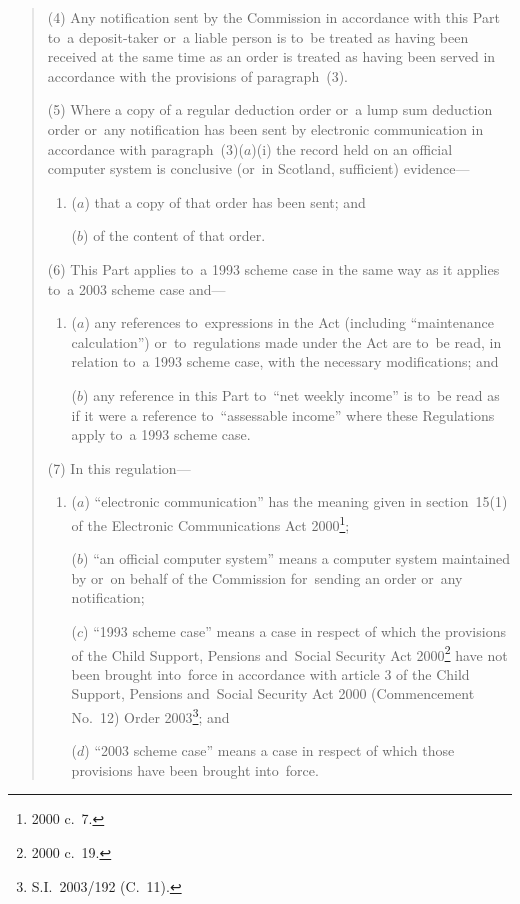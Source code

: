 \documentclass[12pt,a4paper]{article}
\begin{document}
\begin{quotation}
(4) Any notification sent by the Commission in accordance with this Part to~a deposit-taker or~a liable person is to~be treated as having been received at the same time as an order is treated as having been served in accordance with the provisions of paragraph~(3).

(5) Where a copy of a regular deduction order or~a lump sum deduction order or~any notification has been sent by electronic communication in accordance with paragraph~(3)($a$)(i)  the record held on an official computer system is conclusive (or~in Scotland, sufficient) evidence—
\begin{enumerate}\item[]
($a$) that a copy of that order has been sent; and

($b$) of the content of that order.
\end{enumerate}

(6) This Part applies to~a 1993 scheme case in the same way as it applies to~a 2003 scheme case and—
\begin{enumerate}\item[]
($a$) any references to~expressions in the Act (including “maintenance calculation”) or~to~regulations made under the Act are to~be read, in relation to~a 1993 scheme case, with the necessary modifications; and

($b$) any reference in this Part to~“net weekly income” is to~be read as if it were a reference to~“assessable income” where these Regulations apply to~a 1993 scheme case.
\end{enumerate}

(7) In this regulation—
\begin{enumerate}\item[]
($a$) “electronic communication” has the meaning given in section~15(1) of the Electronic Communications Act 2000\footnote{2000 c.~7.};

($b$) “an official computer system” means a computer system maintained by or~on behalf of the Commission for~sending an order or~any notification;

($c$) “1993 scheme case” means a case in respect of which the provisions of the Child Support, Pensions and~Social Security Act 2000\footnote{2000 c.~19.} have not been brought into~force in accordance with article 3 of the Child Support, Pensions and~Social Security Act 2000 (Commencement No.~12) Order 2003\footnote{S.I.~2003/192 (C.~11).}; and

($d$) “2003 scheme case” means a case in respect of which those provisions have been brought into~force.
\end{enumerate}


\end{quotation}
\end{document}
